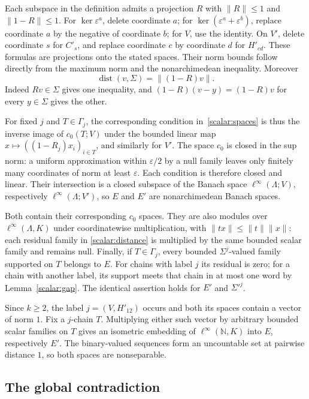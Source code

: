 \documentclass[11pt]{amsart}
\theoremstyle{definition}
\theoremstyle{remark}
\numberwithin{equation}{section}
\newcommand{\N}{\mathbb N}
\newcommand{\linf}{\ell^\infty}
\newcommand{\norm}[1]{\lVert #1\rVert}
\theoremstyle{plain}
\theoremstyle{definition}
\theoremstyle{plain}
\begin{document}
Each subspace in the definition admits a projection $R$ with $\norm R\le1$ and $\norm{1-R}\le1$.
For $\ker\varepsilon^a$, delete coordinate $a$; for $\ker(\varepsilon^a+\varepsilon^b)$, replace coordinate
$a$ by the negative of coordinate $b$; for $V$, use the identity. On $V'$, delete coordinate $s$ for
$C'_s$, and replace coordinate $c$ by coordinate $d$ for $H'_{cd}$. These formulas are projections onto
the stated spaces. Their norm bounds follow directly from the maximum norm and the nonarchimedean
inequality. Moreover
\begin{equation}\label{scalar:distance}
 \operatorname{dist}(v,\Sigma)=\norm{(1-R)v}.
\end{equation}
Indeed $Rv\in\Sigma$ gives one inequality, and $(1-R)(v-y)=(1-R)v$ for every $y\in\Sigma$ gives the other.

For fixed $j$ and $T\in\Gamma_j$, the corresponding condition in~\eqref{scalar:spaces} is thus the inverse
image of $c_0(T;V)$ under the bounded linear map $x\mapsto((1-R_j)x_i)_{i\in T}$, and similarly for $V'$.
The space $c_0$ is closed in the sup norm: a uniform approximation within $\varepsilon/2$ by a null family
leaves only finitely many coordinates of norm at least $\varepsilon$. Each condition is therefore closed
and linear. Their intersection is a closed subspace of the Banach space $\linf(\Lambda;V)$, respectively
$\linf(\Lambda;V')$, so $E$ and $E'$ are nonarchimedean Banach spaces.

Both contain their corresponding $c_0$ spaces. They are also modules over $\linf(\Lambda,K)$ under
coordinatewise multiplication, with $\norm{tx}\le\norm t\norm x$: each residual family in
\eqref{scalar:distance} is multiplied by the same bounded scalar family and remains null.
Finally, if $T\in\Gamma_j$, every bounded $\Sigma^j$\nobreakdash-valued family supported on $T$ belongs
to $E$. For chains with label $j$ its residual is zero; for a chain with another label, its support meets
that chain in at most one word by Lemma~\ref{scalar:gap}. The identical assertion holds for $E'$ and
$\Sigma'^j$.

Since $k\ge2$, the label $j=(V,H'_{12})$ occurs and both its spaces contain a vector of norm $1$.
Fix a $j$-chain $T$. Multiplying either such vector by arbitrary bounded scalar families on $T$ gives
an isometric embedding of $\linf(\N,K)$ into $E$, respectively $E'$. The binary-valued sequences form
an uncountable set at pairwise distance $1$, so both spaces are nonseparable.

\subsection{The global contradiction}
\end{document}
